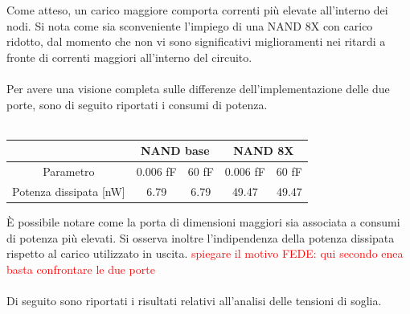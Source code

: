 \documentclass[11pt,  english, makeidx, a4paper, titlepage, oneside]{book}
\begin{document}
\vspace{0.3cm}
Come atteso, un carico maggiore comporta correnti più elevate all'interno dei nodi. Si nota come sia sconveniente l'impiego di una NAND 8X con carico ridotto, dal momento che non vi sono significativi miglioramenti nei ritardi a fronte di correnti maggiori all'interno del circuito.
\\\\
Per avere una visione completa sulle differenze dell'implementazione delle due porte, sono di seguito riportati i consumi di potenza. 
\\\\
\begin{center}
	\begin{tabular}{|c|c|c||c|c|}
	\hline
	& \multicolumn{2}{|c||}{NAND base} & \multicolumn{2}{|c|}{NAND 8X}\\
	\hline
	Parametro & 0.006 fF & 60 fF & 0.006 fF & 60 fF \\
	\hline
	Potenza dissipata [nW] & 6.79 & 6.79 & 49.47 & 49.47\\
	\hline
	\end{tabular}	
\end{center}
\vspace{0.3cm}
È possibile notare come la porta di dimensioni maggiori sia associata a consumi di potenza più elevati. Si osserva inoltre l'indipendenza della potenza dissipata rispetto al carico utilizzato in uscita. \textcolor{red}{spiegare il motivo FEDE: qui secondo enea basta confrontare le due porte}
\\\\
Di seguito sono riportati i risultati relativi all'analisi delle tensioni di soglia.
\\\\
\end{document}
